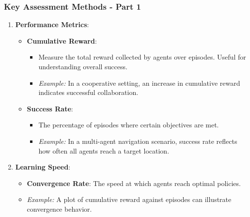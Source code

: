 \documentclass[aspectratio=169]{beamer}
\begin{document}
\begin{frame}[fragile]
    \frametitle{Key Assessment Methods - Part 1}
    \begin{enumerate}
        \item \textbf{Performance Metrics}:
            \begin{itemize}
                \item \textbf{Cumulative Reward}:
                    \begin{itemize}
                        \item Measure the total reward collected by agents over episodes. Useful for understanding overall success.
                        \item \textit{Example:} In a cooperative setting, an increase in cumulative reward indicates successful collaboration.
                    \end{itemize}
                \item \textbf{Success Rate}:
                    \begin{itemize}
                        \item The percentage of episodes where certain objectives are met.
                        \item \textit{Example:} In a multi-agent navigation scenario, success rate reflects how often all agents reach a target location.
                    \end{itemize}
            \end{itemize}
        
        \item \textbf{Learning Speed}:
            \begin{itemize}
                \item \textbf{Convergence Rate}: The speed at which agents reach optimal policies.
                \item \textit{Example:} A plot of cumulative reward against episodes can illustrate convergence behavior.
            \end{itemize}
    \end{enumerate}
\end{frame}
\end{document}
